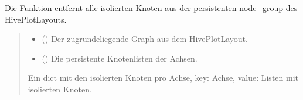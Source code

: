 \documentclass[a4paper,10pt,ngerman]{sphinxmanual}
\begin{document}
\begin{fulllineitems}
\label{\detokenize{api:src.crossing_minimization.remove_isolated_nodes}}
\pysigstartsignatures
\pysiglinewithargsret
{}
{\sphinxparamcomma {}}
{}
\pysigstopsignatures
\sphinxAtStartPar
Die Funktion entfernt alle isolierten Knoten aus der persistenten node\_group des HivePlotLayouts.
\begin{quote}\begin{description}
\begin{itemize}
\item {} 
\sphinxAtStartPar
{} () \textendash{} Der zugrundeliegende Graph aus dem HivePlotLayout.

\item {} 
\sphinxAtStartPar
{} () \textendash{} Die persistente Knotenlisten der Achsen.

\end{itemize}

\sphinxAtStartPar
Ein dict mit den isolierten Knoten pro Achse, key: Achse, value: Listen mit isolierten Knoten.

\sphinxAtStartPar
{}

\end{description}\end{quote}

\end{fulllineitems}

\end{document}
